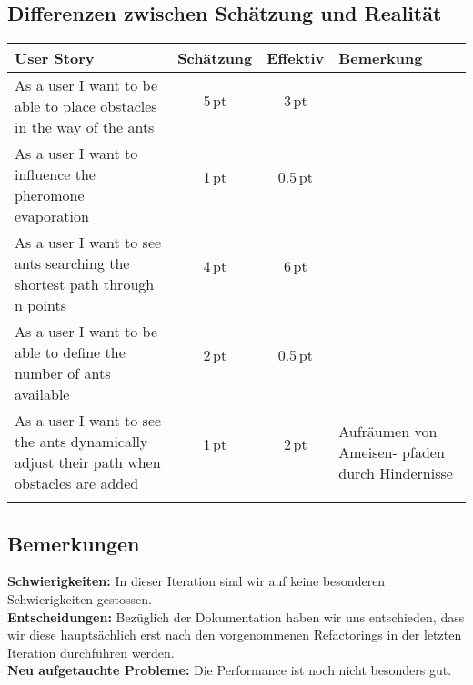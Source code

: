 \subsection*{Differenzen zwischen Schätzung und Realität}

\begin{tabular}{| l | c | c | l |}
  \hline
  \bfseries{User Story} & \bfseries{Schätzung} & \bfseries{Effektiv} & \bfseries{Bemerkung}  \\
  \hline
  \multirow{2}{6.5cm}{As a user I want to be able to place obstacles in the way of the ants} & 5\,pt & 3\,pt &   \multirow{2}{4.5cm}{} \\ 
  & & & \\ \hline
  \multirow{2}{6.5cm}{As a user I want to influence the pheromone evaporation} & 1\,pt &0.5\,pt & \multirow{4}{4.5cm}{}  \\
  & & & \\ \hline
  \multirow{2}{6.5cm}{As a user I want to see ants searching the shortest path through n points} & 4\,pt & 6\,pt & \multirow{2}{4.5cm}{Aufgrund von Bug in Kantenselektionslogik} \\
  & & & \\
  \hline
  \multirow{2}{6.5cm}{As a user I want to be able to define the number of ants available} & 2\,pt & 0.5\,pt & \multirow{2}{4.5cm}{} \\
  & & & \\
  \hline
  \multirow{2}{6.5cm}{As a user I want to see the ants dynamically adjust their path when obstacles are added} & 1\,pt & 2\,pt & \multirow{2}{4.5cm}{Aufräumen von Ameisen- pfaden durch Hindernisse} \\
  & & & \\
  & & & \\
  \hline
\end{tabular}



\subsection*{Bemerkungen}

\begin{small}

\textbf{Schwierigkeiten:} In dieser Iteration sind wir auf keine besonderen Schwierigkeiten gestossen. \\ [-0.25cm]

\textbf{Entscheidungen:} Bezüglich der Dokumentation haben wir uns entschieden, dass wir diese hauptsächlich erst nach den vorgenommenen Refactorings in der letzten Iteration durchführen werden. \\ [-0.25cm]

\textbf{Neu aufgetauchte Probleme:} Die Performance ist noch nicht besonders gut.

\end{small}





